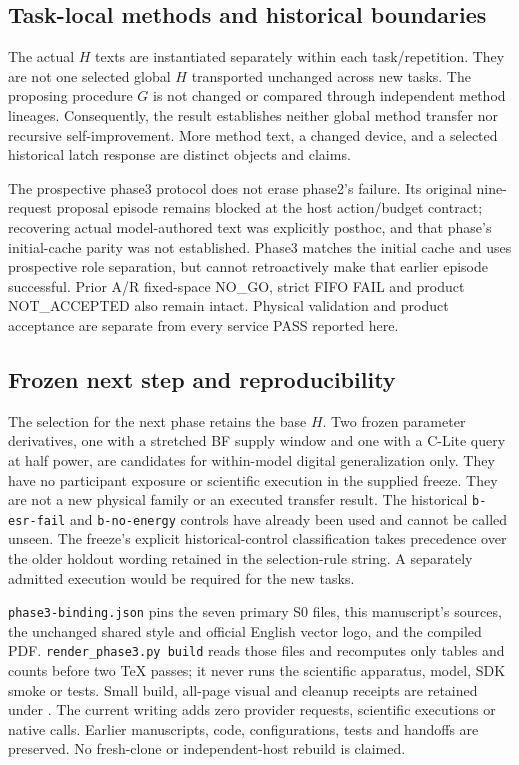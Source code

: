 \subsection{Task-local methods and historical boundaries}
The actual $H$ texts are instantiated separately within each task/repetition.
They are not one selected global $H$ transported unchanged across new tasks.
The proposing procedure $G$ is not changed or compared through independent
method lineages. Consequently, the result establishes neither global method
transfer nor recursive self-improvement. More method text, a changed device,
and a selected historical latch response are distinct objects and claims.

The prospective phase3 protocol does not erase phase2's failure. Its original
nine-request proposal episode remains blocked at the host action/budget
contract; recovering actual model-authored text was explicitly posthoc, and
that phase's initial-cache parity was not established. Phase3 matches the
initial cache and uses prospective role separation, but cannot retroactively
make that earlier episode successful. Prior A/R fixed-space NO\_GO, strict
FIFO FAIL and product NOT\_ACCEPTED also remain intact. Physical validation
and product acceptance are separate from every service PASS reported here.

\subsection{Frozen next step and reproducibility}
The selection for the next phase retains the base $H$. Two frozen parameter
derivatives, one with a stretched BF supply window and one with a C-Lite query
at half power, are candidates for within-model digital generalization only.
They have no participant exposure or scientific
execution in the supplied freeze. They are not a new physical family or an
executed transfer result. The historical \texttt{b-esr-fail} and
\texttt{b-no-energy} controls have already been used and cannot be called
unseen. The freeze's explicit historical-control classification takes
precedence over the older holdout wording retained in the selection-rule
string. A separately admitted execution would be required for the new tasks.

\texttt{phase3-binding.json} pins the seven primary S0 files, this manuscript's
sources, the unchanged shared style and official English vector logo, and the
compiled PDF. \texttt{render\_phase3.py build} reads those files and recomputes
only tables and counts before two TeX passes; it never runs the scientific
apparatus, model, SDK smoke or tests. Small build, all-page visual and cleanup
receipts are retained under
.
The current writing adds zero provider requests, scientific executions or
native calls. Earlier manuscripts, code, configurations, tests and handoffs
are preserved. No fresh-clone or independent-host rebuild is claimed.
